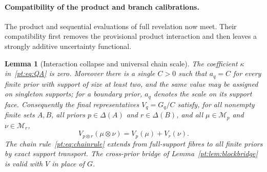 \documentclass[11pt,a4paper]{article}
\newtheorem{lemma}[theorem]{Lemma}
\theoremstyle{definition}
\newcommand{\1}{\mathbf 1}
\begin{document}
\paragraph{Compatibility of the product and branch calibrations.}

The product and sequential evaluations of full revelation now meet.  Their
compatibility first removes the provisional product interaction and then
leaves a strongly additive uncertainty functional.

\begin{lemma}[Interaction collapse and universal chain scale]
\label{pt:lem:scalecoherence}
The coefficient $\kappa$ in~\eqref{pt:eq:QA} is zero.  Moreover there is a
single $C>0$ such that $a_q=C$ for every finite prior with support of size at
least two, and the same value may be assigned on singleton supports; for a
boundary prior, $a_q$ denotes the scale on its support face.
Consequently the final representatives $V_q=G_q/C$ satisfy, for all nonempty
finite sets $A,B$, all priors $p\in\Delta(A)$ and $r\in\Delta(B)$, and all
$\mu\in\mathcal M_p$ and $\nu\in\mathcal M_r$,
\begin{equation}
 V_{p\otimes r}(\mu\otimes\nu)
   =V_p(\mu)+V_r(\nu).
\tag{PA}\label{pt:eq:PArecovered}
\end{equation}
The chain rule~\eqref{pt:eq:chainrule} extends from full-support fibres to
all finite priors by exact support transport.
The cross-prior bridge of Lemma~\ref{pt:lem:blockbridge} is valid with $V$
in place of $G$.
\end{lemma}
\end{document}

